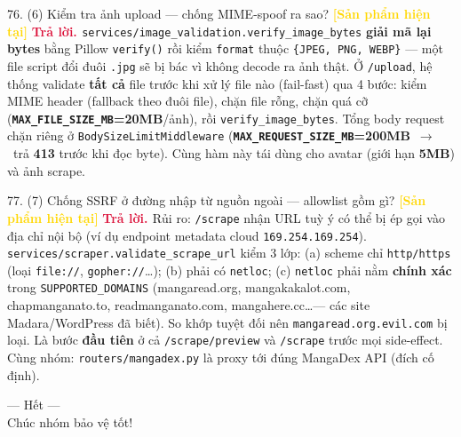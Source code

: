 \documentclass[11pt]{article}
\newcommand{\arr}{\,\ensuremath{\rightarrow}\,}
\newcommand{\tagSP}{\textcolor{gold}{\footnotesize\textbf{[Sản phẩm hiện tại]}}}
\newcommand{\A}{\textbf{\textcolor{crimson}{Trả lời. }}}
\begin{document}
\begin{qa}{76. (6) Kiểm tra ảnh upload --- chống MIME-spoof ra sao? \tagSP}
\A \texttt{services/image\_validation.verify\_image\_bytes} \textbf{giải mã lại bytes} bằng Pillow \texttt{verify()} rồi kiểm \texttt{format} thuộc \texttt{\{JPEG, PNG, WEBP\}} --- một file script đổi đuôi \texttt{.jpg} sẽ bị bác vì không decode ra ảnh thật. Ở \texttt{/upload}, hệ thống validate \textbf{tất cả} file trước khi xử lý file nào (fail-fast) qua 4 bước: kiểm MIME header (fallback theo đuôi file), chặn file rỗng, chặn quá cỡ (\textbf{\texttt{MAX\_FILE\_SIZE\_MB}=20MB}/ảnh), rồi \texttt{verify\_image\_bytes}. Tổng body request chặn riêng ở \texttt{BodySizeLimitMiddleware} (\textbf{\texttt{MAX\_REQUEST\_SIZE\_MB}=200MB} \arr\ trả \textbf{413} trước khi đọc byte). Cùng hàm này tái dùng cho avatar (giới hạn \textbf{5MB}) và ảnh scrape.
\end{qa}

\begin{qa}{77. (7) Chống SSRF ở đường nhập từ nguồn ngoài --- allowlist gồm gì? \tagSP}
\A Rủi ro: \texttt{/scrape} nhận URL tuỳ ý có thể bị ép gọi vào địa chỉ nội bộ (ví dụ endpoint metadata cloud \texttt{169.254.169.254}). \texttt{services/scraper.validate\_scrape\_url} kiểm 3 lớp: (a) scheme chỉ \texttt{http/https} (loại \texttt{file://}, \texttt{gopher://}\ldots); (b) phải có \texttt{netloc}; (c) \texttt{netloc} phải nằm \textbf{chính xác} trong \texttt{SUPPORTED\_DOMAINS} (mangaread.org, mangakakalot.com, chapmanganato.to, readmanganato.com, mangahere.cc\ldots --- các site Madara/WordPress đã biết). So khớp tuyệt đối nên \texttt{mangaread.org.evil.com} bị loại. Là bước \textbf{đầu tiên} ở cả \texttt{/scrape/preview} và \texttt{/scrape} trước mọi side-effect. Cùng nhóm: \texttt{routers/mangadex.py} là proxy tới đúng MangaDex API (đích cố định).
\end{qa}

\vspace{1em}
\begin{center}\color{soft}\small --- Hết --- \\ Chúc nhóm bảo vệ tốt!\end{center}
\end{document}
